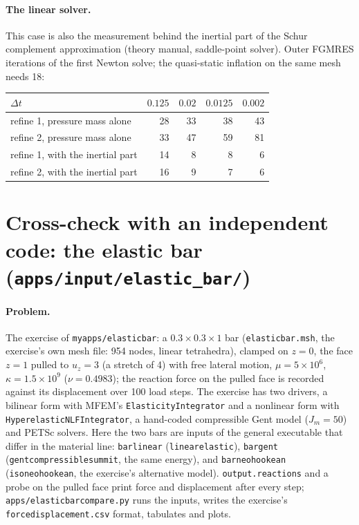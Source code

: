 \documentclass[11pt]{article}
\DeclareRobustCommand{\code}[1]{{\def\_{\textunderscore\allowbreak}\texttt{#1}}}
\DeclareRobustCommand{\file}[1]{{\def\_{\textunderscore\allowbreak}\texttt{#1}}}
\begin{document}
\paragraph{The linear solver.}  This case is also the measurement behind the
inertial part of the Schur complement approximation (theory manual, saddle-point
solver).  Outer FGMRES iterations of the first Newton solve; the
quasi-static inflation on the same mesh needs 18:
\begin{center}
\small
\begin{tabular}{@{}l r r r r@{}}
\toprule
$\Delta t$ & $0.125$ & $0.02$ & $0.0125$ & $0.002$ \\
\midrule
refine 1, pressure mass alone & 28 & 33 & 38 & 43 \\
refine 2, pressure mass alone & 33 & 47 & 59 & 81 \\
refine 1, with the inertial part & 14 & 8 & 8 & 6 \\
refine 2, with the inertial part & 16 & 9 & 7 & 6 \\
\bottomrule
\end{tabular}
\end{center}

\section{Cross-check with an independent code: the elastic bar (\texttt{apps/input/elastic\_bar/})}
\label{sec:elasticbar}

\paragraph{Problem.}
The exercise of \file{myapps/elastic\_bar}: a $0.3\times0.3\times1$ bar
(\file{elastic\_bar.msh}, the exercise's own mesh file: 954 nodes, linear
tetrahedra), clamped on $z = 0$, the face $z = 1$ pulled to $u_z = 3$ (a
stretch of 4) with free lateral motion, $\mu = 5\times10^6$,
$\kappa = 1.5\times10^9$ ($\nu = 0.4983$); the reaction force on the pulled
face is recorded against its displacement over 100 load steps.  The exercise
has two drivers, a bilinear form with MFEM's \code{ElasticityIntegrator} and
a nonlinear form with \code{HyperelasticNLFIntegrator}, a hand-coded
compressible Gent model ($J_m = 50$) and PETSc solvers.  Here the two bars
are inputs of the general executable that differ in the material line:
\file{bar\_linear} (\code{linear\_elastic}), \file{bar\_gent}
(\code{gent\_compressible\_summit}, the same energy), and
\file{bar\_neo\_hookean} (\code{iso\_neo\_hookean}, the exercise's
alternative model).  \code{output.reactions} and a probe on the pulled face
print force and displacement after every step;
\file{apps/elastic\_bar\_compare.py} runs the inputs, writes the exercise's
\file{force\_displacement.csv} format, tabulates and plots.
\end{document}
